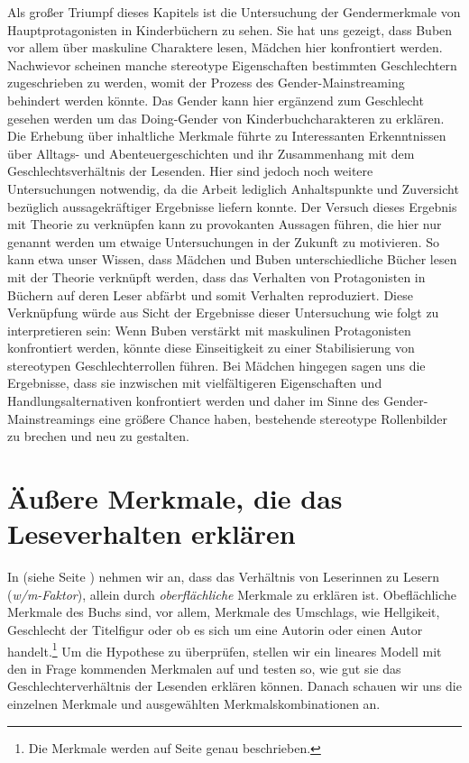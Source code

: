 Als großer Triumpf dieses Kapitels ist die Untersuchung der
Gendermerkmale von Hauptprotagonisten in Kinderbüchern zu sehen. Sie hat
uns gezeigt, dass Buben vor allem über maskuline Charaktere lesen,
Mädchen hier konfrontiert werden. Nachwievor scheinen manche stereotype
Eigenschaften bestimmten Geschlechtern zugeschrieben zu werden, womit
der Prozess des Gender-Mainstreaming behindert werden könnte. Das Gender
kann hier ergänzend zum Geschlecht gesehen werden um das Doing-Gender
von Kinderbuchcharakteren zu erklären. Die Erhebung über inhaltliche
Merkmale führte zu Interessanten Erkenntnissen über Alltags- und
Abenteuergeschichten und ihr Zusammenhang mit dem Geschlechtsverhältnis
der Lesenden. Hier sind jedoch noch weitere Untersuchungen notwendig, da
die Arbeit lediglich Anhaltspunkte und Zuversicht bezüglich
aussagekräftiger Ergebnisse liefern konnte. Der Versuch dieses Ergebnis
mit Theorie zu verknüpfen kann zu provokanten Aussagen führen, die hier
nur genannt werden um etwaige Untersuchungen in der Zukunft zu
motivieren. So kann etwa unser Wissen, dass Mädchen und Buben
unterschiedliche Bücher lesen mit der Theorie verknüpft werden, dass das
Verhalten von Protagonisten in Büchern auf deren Leser abfärbt und somit
Verhalten reproduziert. Diese Verknüpfung würde aus Sicht der Ergebnisse
dieser Untersuchung wie folgt zu interpretieren sein: Wenn Buben
verstärkt mit maskulinen Protagonisten konfrontiert werden, könnte diese
Einseitigkeit zu einer Stabilisierung von stereotypen Geschlechterrollen
führen. Bei Mädchen hingegen sagen uns die Ergebnisse, dass sie
inzwischen mit vielfältigeren Eigenschaften und Handlungsalternativen
konfrontiert werden und daher im Sinne des Gender-Mainstreamings eine
größere Chance haben, bestehende stereotype Rollenbilder zu brechen und
neu zu gestalten.

\chapter{Äußere Merkmale, die das Leseverhalten erklären}

In  (siehe Seite \pageref{h5}) nehmen wir an, dass das
Verhältnis von Leserinnen zu Lesern (\emph{w/m-Faktor}), allein durch
\emph{oberflächliche} Merkmale zu erklären ist. Obeflächliche Merkmale
des Buchs sind, vor allem, Merkmale des Umschlags, wie Hellgikeit,
Geschlecht der Titelfigur oder ob es sich um eine Autorin oder einen
Autor
handelt.\footnote{Die Merkmale werden auf Seite \pageref{meth.merkmale} genau beschrieben.}
Um die Hypothese zu überprüfen, stellen wir ein lineares Modell mit den
in Frage kommenden Merkmalen auf und testen so, wie gut sie das
Geschlechterverhältnis der Lesenden erklären können. Danach schauen wir
uns die einzelnen Merkmale und ausgewählten Merkmalskombinationen an.

